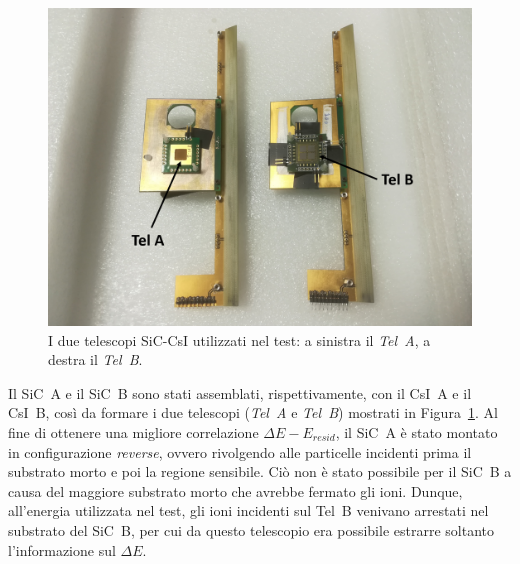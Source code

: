 \begin{figure} [!t]
	\centering
	\includegraphics[scale=0.5]{Grafici/telescopi_etichette.png}
	\caption{I due telescopi SiC-CsI utilizzati nel test: a sinistra il \emph{Tel~A}, a destra il \emph{Tel~B}.} \label{fig:telescopi}
\end{figure}






Il SiC~A e il SiC~B sono stati assemblati, rispettivamente, con il CsI~A e il CsI~B, così da formare i due telescopi (\emph{Tel~A} e \emph{Tel~B}) mostrati in Figura~\ref{fig:telescopi}.
Al fine di ottenere una migliore correlazione $\Delta E - E_{resid}$, il SiC~A è stato montato in configurazione \emph{reverse}, ovvero rivolgendo alle particelle incidenti prima il substrato morto e poi la regione sensibile.
Ciò non è stato possibile per il SiC~B a causa del maggiore substrato morto che avrebbe fermato gli ioni.
Dunque, all'energia utilizzata nel test, gli ioni incidenti sul Tel~B venivano arrestati nel substrato del SiC~B, per cui da questo telescopio era possibile estrarre soltanto l'informazione sul $\Delta E$.

